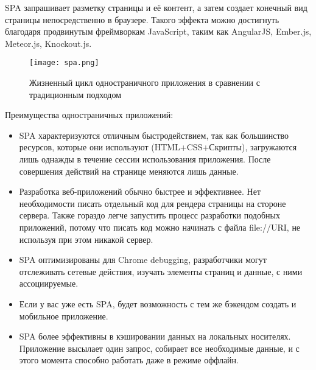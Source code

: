 SPA запрашивает разметку страницы и её контент, а затем создает конечный вид страницы непосредственно в браузере. Такого эффекта можно достигнуть благодаря продвинутым
фреймворкам JavaScript, таким как AngularJS, Ember.js, Meteor.js, Knockout.js.

\begin{figure}[ht]
\centering
  \texttt{[image: spa.png]}
  \caption{Жизненный цикл одностраничного приложения в сравнении с традиционным подходом}
  \label{figure:domain:spa}
\end{figure}

Преимущества одностраничных приложений:
\begin{itemize}
\item SPA характеризуются отличным быстродействием, так как большинство ресурсов, которые они используют (HTML+CSS+Скрипты), загружаются лишь однажды в течение сессии 
использования приложения. После совершения действий на странице меняются лишь данные.
\item Разработка веб-приложений обычно быстрее и эффективнее. Нет необходимости писать отдельный код для рендера страницы на стороне сервера. Также гораздо легче 
запустить процесс разработки подобных приложений, потому что писать код можно начинать с файла file://URI, не используя при этом никакой сервер.
\item SPA оптимизированы для Chrome debugging, разработчики могут отслеживать сетевые действия, изучать элементы страниц и данные, с ними ассоциируемые.
\item Если у вас уже есть SPA, будет возможность с тем же бэкендом создать и мобильное приложение.
\item SPA более эффективны в кэшировании данных на локальных носителях. Приложение высылает один запрос, собирает все необходимые данные, и с этого момента
 способно работать даже в режиме оффлайн.
\end{itemize}

